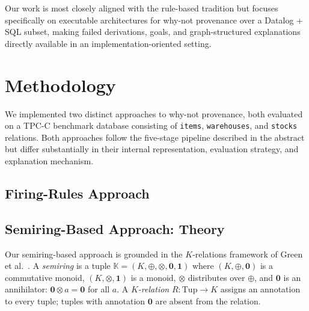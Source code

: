 \documentclass{llncs}
\begin{document}
Our work is most closely aligned with the rule-based tradition but
focuses specifically on executable architectures for why-not
provenance over a Datalog + SQL subset, making failed derivations,
goals, and graph-structured explanations directly available in an
implementation-oriented setting.

\section{Methodology}
\label{sec:methodology}

We implemented two distinct approaches to why-not provenance, both
evaluated on a TPC-C benchmark database consisting of
\texttt{items}, \texttt{warehouses}, and \texttt{stocks} relations.
Both approaches follow the five-stage pipeline described in the
abstract but differ substantially in their internal representation,
evaluation strategy, and explanation mechanism.

\subsection{Firing-Rules Approach}
\label{sec:firing-rules}


\subsection{Semiring-Based Approach: Theory}
\label{sec:semiring-theory}

Our semiring-based approach is grounded in the $K$-relations framework
of Green et al.~\cite{Green2007}. A \emph{semiring} is a tuple
$\mathbb{K} = (K, \oplus, \otimes, \mathbf{0}, \mathbf{1})$ where
$(K, \oplus, \mathbf{0})$ is a commutative monoid,
$(K, \otimes, \mathbf{1})$ is a monoid,
$\otimes$ distributes over $\oplus$, and
$\mathbf{0}$ is an annihilator: $\mathbf{0} \otimes a = \mathbf{0}$ for all $a$.
A \emph{$K$-relation} $R : \mathrm{Tup} \rightarrow K$ assigns an
annotation to every tuple; tuples with annotation $\mathbf{0}$ are
absent from the relation.
\end{document}
